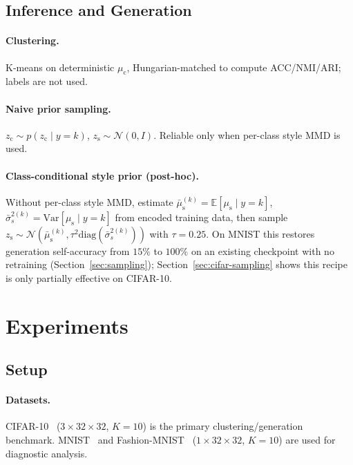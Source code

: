 \documentclass[10pt,letterpaper]{article}
\newcommand{\zc}{z_{\mathrm{c}}}
\newcommand{\zs}{z_{\mathrm{s}}}
\newcommand{\muc}{\mu_{\mathrm{c}}}
\newcommand{\mus}{\mu_{\mathrm{s}}}
\newcommand{\diag}{\mathrm{diag}}
\begin{document}
\subsection{Inference and Generation}

\paragraph{Clustering.} K-means on deterministic $\muc$, Hungarian-matched
to compute ACC/NMI/ARI; labels are not used.

\paragraph{Naive prior sampling.} $\zc\sim p(\zc\mid y{=}k)$,
$\zs\sim\mathcal{N}(0,I)$. Reliable only when per-class style MMD is used.

\paragraph{Class-conditional style prior (post-hoc).} Without per-class
style MMD, estimate $\bar\mus^{(k)}=\mathbb{E}[\mus\mid y{=}k]$,
$\bar\sigma_s^{2(k)}=\mathrm{Var}[\mus\mid y{=}k]$ from encoded training
data, then sample $\zs\sim\mathcal{N}(\bar\mus^{(k)},\tau^2\diag(\bar\sigma_s^{2(k)}))$
with $\tau=0.25$. On MNIST this restores generation self-accuracy from
$15\%$ to $100\%$ on an existing checkpoint with no retraining
(Section~\ref{sec:sampling}); Section~\ref{sec:cifar-sampling} shows this
recipe is only partially effective on CIFAR-10.

\section{Experiments}
\label{sec:experiments}

\subsection{Setup}

\paragraph{Datasets.} CIFAR-10~\citep{krizhevsky2009learning}
($3{\times}32{\times}32$, $K{=}10$) is the primary clustering/generation
benchmark. MNIST~\citep{lecun1998gradient} and
Fashion-MNIST~\citep{xiao2017fashion} ($1{\times}32{\times}32$, $K{=}10$)
are used for diagnostic analysis.
\end{document}

